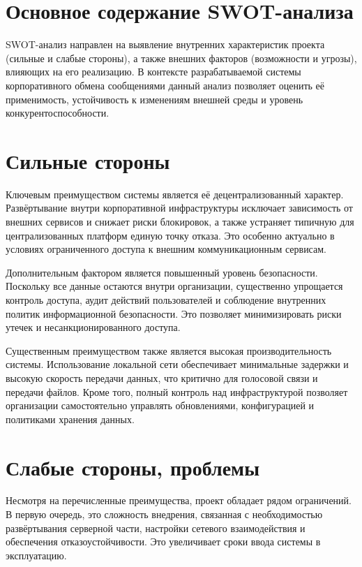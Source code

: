 \documentclass[14pt,a4paper]{extarticle}
\begin{document}
\section{Основное содержание SWOT-анализа}

SWOT-анализ направлен на выявление внутренних характеристик проекта (сильные и слабые стороны), а также внешних факторов (возможности и угрозы), влияющих на его реализацию. В контексте разрабатываемой системы корпоративного обмена сообщениями данный анализ позволяет оценить её применимость, устойчивость к изменениям внешней среды и уровень конкурентоспособности.

\section{Сильные стороны}

Ключевым преимуществом системы является её децентрализованный характер. Развёртывание внутри корпоративной инфраструктуры исключает зависимость от внешних сервисов и снижает риски блокировок, а также устраняет типичную для централизованных платформ единую точку отказа. Это особенно актуально в условиях ограниченного доступа к внешним коммуникационным сервисам.

Дополнительным фактором является повышенный уровень безопасности. Поскольку все данные остаются внутри организации, существенно упрощается контроль доступа, аудит действий пользователей и соблюдение внутренних политик информационной безопасности. Это позволяет минимизировать риски утечек и несанкционированного доступа.

Существенным преимуществом также является высокая производительность системы. Использование локальной сети обеспечивает минимальные задержки и высокую скорость передачи данных, что критично для голосовой связи и передачи файлов. Кроме того, полный контроль над инфраструктурой позволяет организации самостоятельно управлять обновлениями, конфигурацией и политиками хранения данных.

\section{Слабые стороны, проблемы}

Несмотря на перечисленные преимущества, проект обладает рядом ограничений. В первую очередь, это сложность внедрения, связанная с необходимостью развёртывания серверной части, настройки сетевого взаимодействия и обеспечения отказоустойчивости. Это увеличивает сроки ввода системы в эксплуатацию.
\end{document}
